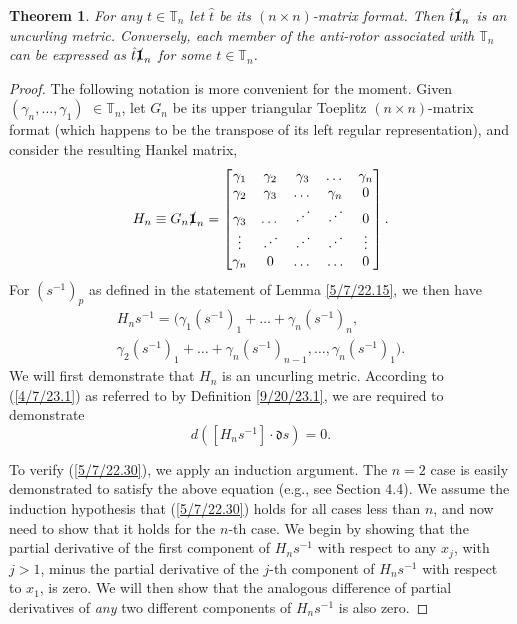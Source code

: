 \documentclass{amsart}
\numberwithin{equation}{section}
\newtheorem{theorem}{Theorem}
\theoremstyle{definition}
\numberwithin{theorem}{section}
\begin{document}
\begin{theorem} \label{5/4/22.2} For any $t\in \mathbb{T}_n$ let $\hat{t}$ be its $(n\times n)$-matrix format.    Then $\hat{t} \slashed{\bf 1}_n$ is an uncurling metric.  Conversely, each member of the anti-rotor associated with $\mathbb{T}_n$ can be expressed as $\hat{t}\slashed{\bf 1}_n$ for some $t\in \mathbb{T}_n$.   \end{theorem}


\begin{proof} The following notation is more convenient for the moment.  Given $(\gamma_n,\dots,\gamma_1)$ $\in \mathbb{T}_n$, let $G_n$ be its upper triangular Toeplitz $(n\times n)$-matrix format (which happens to be the transpose of its left regular representation), and consider the resulting Hankel matrix, 
\begin{equation}\label{5/7/22.20} H_n \equiv G_n \slashed{\bf 1}_n = \begin{bmatrix} \gamma_1 & \gamma_2 & \gamma_3 & \dots & \gamma_n \\ \gamma_2 & \gamma_3 & \dots & \gamma_n & 0 \\ \gamma_3 & \dots & \iddots & \iddots & 0  \\ \vdots & \iddots & \iddots & \iddots & \vdots \\ \gamma_n & 0 & \dots & \ldots & 0 \end{bmatrix}.\end{equation}
For $\left( s^{-1} \right)_p$ as defined in the statement of Lemma \ref{5/7/22.15}, we then have
\begin{multline}  H_n s^{-1}   =  \Big( \gamma_1\left( s^{-1} \right)_1  + \dots + \gamma_n \left( s^{-1} \right)_n, \\ \gamma_2\left( s^{-1} \right)_1  + \dots + \gamma_n \left( s^{-1} \right)_{n-1}, 
  \dots , 
 \gamma_n \left( s^{-1} \right)_1 \Big). \label{5/7/22.40}
\end{multline}
 We will first demonstrate that $H_n$ is an uncurling metric.  According to (\ref{4/7/23.1}) as referred to by Definition \ref{9/20/23.1}, we are required to demonstrate 
\begin{equation}\label{5/7/22.30} d\left([H_n s^{-1}]\cdot \mathfrak{d}s\right) = 0.\end{equation}  

To verify (\ref{5/7/22.30}), we apply an induction argument.  The $n=2$ case is easily demonstrated to satisfy the above equation (e.g., see Section 4.4).  We assume the induction hypothesis that (\ref{5/7/22.30}) holds for all cases less than $n$, and now need to show that it holds for the $n$-th case.  
We begin by showing that the partial derivative of the first component of $H_n s^{-1}$ with respect to any $x_j$, with $j>1$, minus the partial derivative of the $j$-th component of $H_n s^{-1}$ with respect to $x_1$, is zero. We will then show that the analogous difference of partial derivatives of {\it any} two different components of $H_ns^{-1}$ is also zero.


\end{proof}
\end{document}
